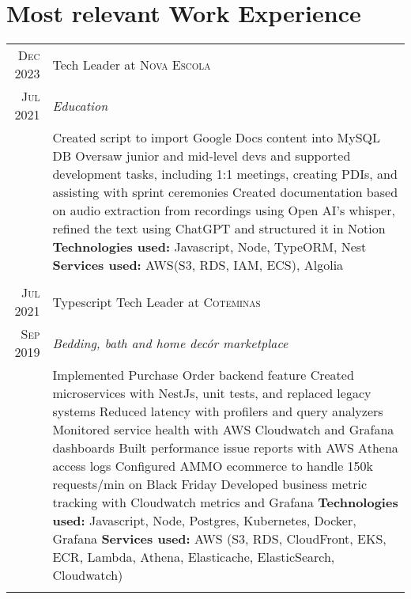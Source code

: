 \documentclass[a4paper,10pt]{article}
\begin{document}
\section{Most relevant Work Experience}
\begin{tabular}{r|p{11cm}}

\textsc{Dec 2023} & Tech Leader at \textsc{Nova Escola} \\\textsc{Jul 2021}&\emph{Education }\\&\footnotesize{ 
 Created script to import Google Docs content into MySQL DB \newline
 Oversaw junior and mid-level devs and supported development tasks, including 1:1 meetings, creating PDIs, and assisting with sprint ceremonies \newline
 Created documentation based on audio extraction from recordings using Open AI's whisper, refined the text using ChatGPT and structured it in Notion\newline
 \textbf{Technologies used:} Javascript, Node, TypeORM, Nest \newline
\textbf{Services used:} AWS(S3, RDS, IAM, ECS), Algolia}\\\multicolumn{2}{c}{} \\


\textsc{Jul 2021} & Typescript Tech Leader at \textsc{Coteminas} \\\textsc{Sep 2019}&\emph{Bedding, bath and home decór marketplace }\\&\footnotesize{ 
 Implemented Purchase Order backend feature \newline
 Created microservices with NestJs, unit tests, and replaced legacy systems \newline
 Reduced latency with profilers and query analyzers \newline
 Monitored service health with AWS Cloudwatch and Grafana dashboards \newline
 Built performance issue reports with AWS Athena access logs \newline
 Configured AMMO ecommerce to handle 150k requests/min on Black Friday \newline
 Developed business metric tracking with Cloudwatch metrics and Grafana \newline 
\textbf{Technologies used:} Javascript, Node, Postgres, Kubernetes, Docker, Grafana \newline
\textbf{Services used:} AWS (S3, RDS, CloudFront, EKS, ECR, Lambda, Athena, Elasticache, ElasticSearch, Cloudwatch)}\\\multicolumn{2}{c}{} \\



\end{tabular}
\end{document}
